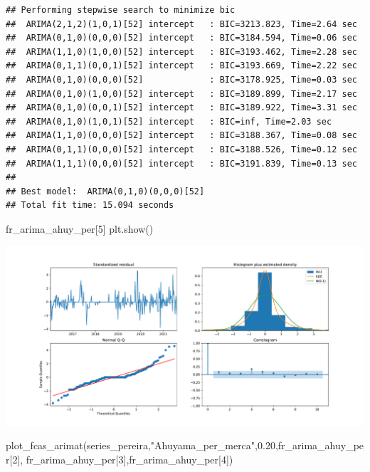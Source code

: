 \documentclass[
]{book}
\newenvironment{Shaded}{\begin{snugshade}}{\end{snugshade}}
\newcommand{\DecValTok}[1]{\textcolor[rgb]{0.00,0.00,0.81}{#1}}
\newcommand{\FloatTok}[1]{\textcolor[rgb]{0.00,0.00,0.81}{#1}}
\newcommand{\NormalTok}[1]{#1}
\newcommand{\StringTok}[1]{\textcolor[rgb]{0.31,0.60,0.02}{#1}}
\begin{document}
\begin{verbatim}
## Performing stepwise search to minimize bic
##  ARIMA(2,1,2)(1,0,1)[52] intercept   : BIC=3213.823, Time=2.64 sec
##  ARIMA(0,1,0)(0,0,0)[52] intercept   : BIC=3184.594, Time=0.06 sec
##  ARIMA(1,1,0)(1,0,0)[52] intercept   : BIC=3193.462, Time=2.28 sec
##  ARIMA(0,1,1)(0,0,1)[52] intercept   : BIC=3193.669, Time=2.22 sec
##  ARIMA(0,1,0)(0,0,0)[52]             : BIC=3178.925, Time=0.03 sec
##  ARIMA(0,1,0)(1,0,0)[52] intercept   : BIC=3189.899, Time=2.17 sec
##  ARIMA(0,1,0)(0,0,1)[52] intercept   : BIC=3189.922, Time=3.31 sec
##  ARIMA(0,1,0)(1,0,1)[52] intercept   : BIC=inf, Time=2.03 sec
##  ARIMA(1,1,0)(0,0,0)[52] intercept   : BIC=3188.367, Time=0.08 sec
##  ARIMA(0,1,1)(0,0,0)[52] intercept   : BIC=3188.526, Time=0.12 sec
##  ARIMA(1,1,1)(0,0,0)[52] intercept   : BIC=3191.839, Time=0.13 sec
## 
## Best model:  ARIMA(0,1,0)(0,0,0)[52]          
## Total fit time: 15.094 seconds
\end{verbatim}

\begin{Shaded}
\begin{Highlighting}[]
\NormalTok{fr\_arima\_ahuy\_per[}\DecValTok{5}\NormalTok{]}
\NormalTok{plt.show()}
\end{Highlighting}
\end{Shaded}

\includegraphics{bookdown-demo_files/figure-latex/unnamed-chunk-160-153.pdf}

\begin{Shaded}
\begin{Highlighting}[]

\NormalTok{plot\_fcas\_arimat(series\_pereira,}\StringTok{"Ahuyama\_per\_merca"}\NormalTok{,}\FloatTok{0.20}\NormalTok{,fr\_arima\_ahuy\_per[}\DecValTok{2}\NormalTok{],}
\NormalTok{fr\_arima\_ahuy\_per[}\DecValTok{3}\NormalTok{],fr\_arima\_ahuy\_per[}\DecValTok{4}\NormalTok{])}
\end{Highlighting}
\end{Shaded}
\end{document}
